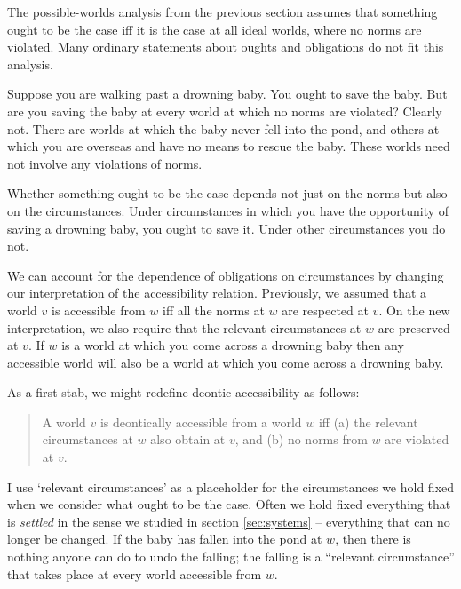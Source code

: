 The possible-worlds analysis from the previous section assumes that something
ought to be the case iff it is the case at all ideal worlds, where no norms are
violated. Many ordinary statements about oughts and obligations do not fit this
analysis.

Suppose you are walking past a drowning baby. You ought to save the baby. But
are you saving the baby at every world at which no norms are violated? Clearly
not. There are worlds at which the baby never fell into the pond, and others at
which you are overseas and have no means to rescue the baby. These worlds need
not involve any violations of norms.

Whether something ought to be the case depends not just on the norms but also on
the circumstances. Under circumstances in which you have the opportunity of
saving a drowning baby, you ought to save it. Under other circumstances you do
not.


We can account for the dependence of obligations on circumstances by changing
our interpretation of the accessibility relation. Previously, we assumed that a
world $v$ is accessible from $w$ iff all the norms at $w$ are respected at $v$.
On the new interpretation, we also require that the relevant circumstances at
$w$ are preserved at $v$. If $w$ is a world at which you come across a drowning
baby then any accessible world will also be a world at which you come across a
drowning baby.

As a first stab, we might redefine deontic accessibility as follows:

\begin{quote}
  A world $v$ is deontically accessible from a world $w$ iff (a) the relevant
  circumstances at $w$ also obtain at $v$, and (b) no norms from $w$ are
  violated at $v$.
\end{quote}
%
I use `relevant circumstances' as a placeholder for the circumstances we hold
fixed when we consider what ought to be the case. Often we hold fixed everything
that is \emph{settled} in the sense we studied in section \ref{sec:systems} --
everything that can no longer be changed. If the baby has fallen into the pond
at $w$, then there is nothing anyone can do to undo the falling; the falling is
a ``relevant circumstance'' that takes place at every world accessible from $w$.

